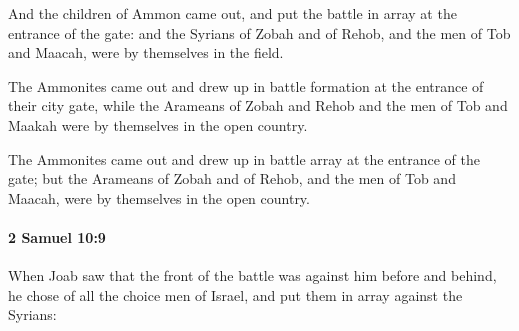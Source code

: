 			\begin{versebox}
					\item[BHS] 
					\item[ASV] And the children of Ammon came out, and put the battle in array at the entrance of the gate: and the Syrians of Zobah and of Rehob, and the men of Tob and Maacah, were by themselves in the field.
					\item[NIV] The Ammonites came out and drew up in battle formation at the entrance of their city gate, while the Arameans of Zobah and Rehob and the men of Tob and Maakah were by themselves in the open country.
					\item[NRSV] The Ammonites came out and drew up in battle array at the entrance of the gate; but the Arameans of Zobah and of Rehob, and the men of Tob and Maacah, were by themselves in the open country.
			\end{versebox}

		\paragraph{2 Samuel 10:9} %
			\label{2SAMUEL-10-9}

			When Joab saw that the front of the battle was against him before and behind, he chose of all the choice men of Israel, and put them in array against the Syrians:

